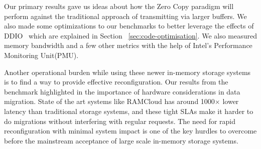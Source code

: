 Our primary results gave us ideas about how the Zero Copy paradigm will perform against
the traditional approach of transmitting via larger buffers. We also made some optimizations to our 
benchmarks to better leverage the effects of DDIO~\cite{ddio} which are explained in Section ~\ref{sec:code-optimisation}. 
We also measured memory bandwidth and a few other metrics with the help of Intel\textregistered's Performance Monitoring Unit(PMU).

Another operational burden while using these newer in-memory storage systems is to find a way to 
provide effective reconfiguration. Our results from the benchmark highlighted in the importance of 
hardware considerations in data migration. State of the art systems like RAMCloud has around 1000$\times$
lower latency than traditional storage systems, and these tight SLAs make it harder to do migrations
without interfering with regular requests. The need for rapid reconfiguration with minimal system 
impact is one of the key hurdles to overcome before the mainstream acceptance of large scale 
in-memory storage systems.

